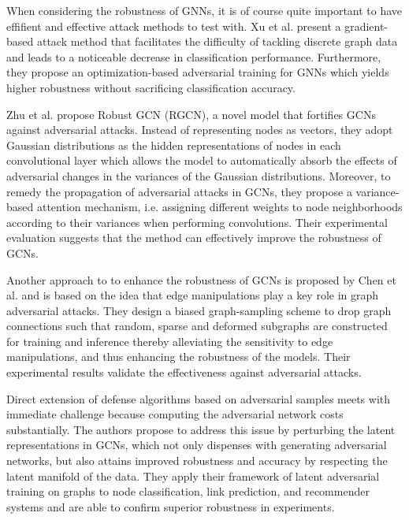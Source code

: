 \documentclass[a4paper,preprint]{sig-alternate}
\begin{document}
When considering the robustness of GNNs, it is of course quite important to have effifient and effective attack methods to test with.
Xu et al. \cite{xu2019topology} present a gradient-based attack method that facilitates the difficulty of tackling discrete graph data
and leads to a noticeable decrease in classification performance. Furthermore, they propose an optimization-based adversarial training
for GNNs which yields higher robustness without sacrificing classification accuracy.\newline

Zhu et al. \cite{10.1145/3292500.3330851} propose Robust GCN (RGCN), a novel model that fortifies GCNs against adversarial attacks.
Instead of representing  nodes as vectors, they adopt Gaussian distributions as the hidden representations of nodes in each
convolutional layer which allows the model to automatically absorb the effects of adversarial changes in the variances of the Gaussian distributions.
Moreover, to remedy the propagation of adversarial attacks in GCNs, they propose a variance-based attention mechanism, i.e. assigning different
weights to node neighborhoods according to their variances when performing convolutions. Their experimental evaluation suggests that
the method can effectively improve the robustness of GCNs.\newline

Another approach to to enhance the robustness of GCNs is proposed by Chen et al. \cite{Chen2020} and is based on the idea that
edge manipulations play a key role in graph adversarial attacks. They design a biased graph-sampling scheme to drop graph connections
such that random, sparse and deformed subgraphs are constructed for training and inference thereby alleviating the sensitivity 
to edge manipulations, and thus enhancing the robustness of the models. Their experimental results validate the effectiveness 
against adversarial attacks.\newline

Direct extension of defense algorithms based on adversarial samples meets with immediate challenge because computing the adversarial
network costs substantially. \cite{Jin2020} The authors propose to address this issue by perturbing the latent representations in GCNs,
which not only dispenses with generating adversarial networks, but also attains improved robustness and accuracy by respecting the latent
manifold of the data. They apply their framework of latent adversarial training on graphs to node classification, link prediction, and
recommender systems and are able to confirm superior robustness in experiments.\newline
\end{document}
